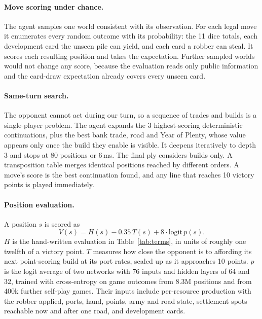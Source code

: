 \documentclass[11pt,a4paper]{article}
\begin{document}
\paragraph{Move scoring under chance.} The agent samples one world consistent with its observation. For each legal
move it enumerates every random outcome with its probability: the 11 dice totals, each development card the unseen
pile can yield, and each card a robber can steal. It scores each resulting position and takes the expectation.
Further sampled worlds would not change any score, because the evaluation reads only public information and the
card-draw expectation already covers every unseen card.

\paragraph{Same-turn search.} The opponent cannot act during our turn, so a sequence of trades and builds is a
single-player problem. The agent expands the 3 highest-scoring deterministic continuations, plus the best bank
trade, road and Year of Plenty, whose value appears only once the build they enable is visible. It deepens
iteratively to depth 3 and stops at 80 positions or 6\,ms. The final ply considers builds only. A transposition table
merges identical positions reached by different orders. A move's score is the best continuation found, and any
line that reaches 10 victory points is played immediately.

\paragraph{Position evaluation.} A position $s$ is scored as
\[ V(s) = H(s) - 0.35\,T(s) + 8\cdot\mathrm{logit}\,p(s). \]
$H$ is the hand-written evaluation in Table~\ref{tab:terms}, in units of roughly one twelfth of a victory point.
$T$ measures how close the opponent is to affording its next point-scoring build at its port rates, scaled up as
it approaches 10 points. $p$ is the logit average of two networks with 76 inputs and hidden layers of 64 and 32,
trained with cross-entropy on game outcomes from 8.3M positions and from 400k further self-play games. Their inputs
include per-resource production with the robber applied, ports, hand, points, army and road state, settlement spots
reachable now and after one road, and development cards.
\end{document}
